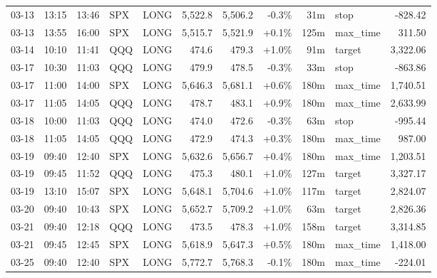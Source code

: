 \documentclass[11pt,a4paper,twoside]{article}
\begin{document}
\begin{center}
\begin{longtable}{>{\color{txtmain}}l l l l l r r r r >{\color{txtmain}}l r}
03-13 & 13:15 & 13:46 & SPX & LONG & 5,522.8 & 5,506.2 & \textcolor{lossred}{-0.3\%} & 31m & stop & \textcolor{lossred}{-828.42} \\
03-13 & 13:55 & 16:00 & SPX & LONG & 5,515.7 & 5,521.9 & \textcolor{wingreen}{+0.1\%} & 125m & max\_time & \textcolor{wingreen}{311.50} \\
03-14 & 10:10 & 11:41 & QQQ & LONG & 474.6 & 479.3 & \textcolor{wingreen}{+1.0\%} & 91m & target & \textcolor{wingreen}{3,322.06} \\
03-17 & 10:30 & 11:03 & QQQ & LONG & 479.9 & 478.5 & \textcolor{lossred}{-0.3\%} & 33m & stop & \textcolor{lossred}{-863.86} \\
03-17 & 11:00 & 14:00 & SPX & LONG & 5,646.3 & 5,681.1 & \textcolor{wingreen}{+0.6\%} & 180m & max\_time & \textcolor{wingreen}{1,740.51} \\
03-17 & 11:05 & 14:05 & QQQ & LONG & 478.7 & 483.1 & \textcolor{wingreen}{+0.9\%} & 180m & max\_time & \textcolor{wingreen}{2,633.99} \\
03-18 & 10:00 & 11:03 & QQQ & LONG & 474.0 & 472.6 & \textcolor{lossred}{-0.3\%} & 63m & stop & \textcolor{lossred}{-995.44} \\
03-18 & 11:05 & 14:05 & QQQ & LONG & 472.9 & 474.3 & \textcolor{wingreen}{+0.3\%} & 180m & max\_time & \textcolor{wingreen}{987.00} \\
03-19 & 09:40 & 12:40 & SPX & LONG & 5,632.6 & 5,656.7 & \textcolor{wingreen}{+0.4\%} & 180m & max\_time & \textcolor{wingreen}{1,203.51} \\
03-19 & 09:45 & 11:52 & QQQ & LONG & 475.3 & 480.1 & \textcolor{wingreen}{+1.0\%} & 127m & target & \textcolor{wingreen}{3,327.17} \\
03-19 & 13:10 & 15:07 & SPX & LONG & 5,648.1 & 5,704.6 & \textcolor{wingreen}{+1.0\%} & 117m & target & \textcolor{wingreen}{2,824.07} \\
03-20 & 09:40 & 10:43 & SPX & LONG & 5,652.7 & 5,709.2 & \textcolor{wingreen}{+1.0\%} & 63m & target & \textcolor{wingreen}{2,826.36} \\
03-21 & 09:40 & 12:18 & QQQ & LONG & 473.5 & 478.3 & \textcolor{wingreen}{+1.0\%} & 158m & target & \textcolor{wingreen}{3,314.85} \\
03-21 & 09:45 & 12:45 & SPX & LONG & 5,618.9 & 5,647.3 & \textcolor{wingreen}{+0.5\%} & 180m & max\_time & \textcolor{wingreen}{1,418.00} \\
03-25 & 09:40 & 12:40 & SPX & LONG & 5,772.7 & 5,768.3 & \textcolor{lossred}{-0.1\%} & 180m & max\_time & \textcolor{lossred}{-224.01} \\

\end{longtable}
\end{center}
\end{document}
